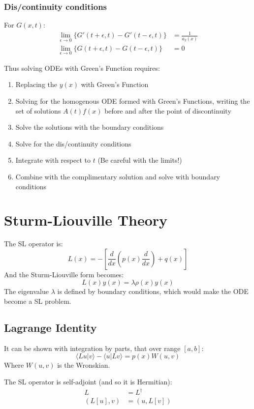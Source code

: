 \documentclass[12pt]{article}
\begin{document}
\subsubsection{Dis/continuity conditions}
For $G(x,t)$:
\begin{align*}
    \lim_{\epsilon\to0}\{G'(t+\epsilon,t)-G'(t-\epsilon,t)\} &= \frac{1}{a_2(x)}\\
    \lim_{\epsilon\to0}\{G(t+\epsilon,t)-G(t-\epsilon,t)\} &= 0
\end{align*}

Thus solving ODEs with Green's Function requires:
\begin{enumerate}
    \item Replacing the $y(x)$ with Green's Function
    \item Solving for the homogenous ODE formed with Green's Functions, writing the set of solutions $A(t)f(x)$ before and after the point of discontinuity
    \item Solve the solutions with the boundary conditions
    \item Solve for the dis/continuity conditions
    \item Integrate with respect to $t$ (Be careful with the limits!)
    \item Combine with the complimentary solution and solve with boundary conditions
\end{enumerate}

\section{Sturm-Liouville Theory}
The SL operator is:
\[L(x) = -\left[\frac{d}{dx}\left(p(x)\frac{d}{dx}\right)+q(x) \right]\]
And the Sturm-Liouville form becomes:
\[ L(x)y(x) = \lambda \rho(x)y(x)\]
The eigenvalue $\lambda$ is defined by boundary conditions, which would make the ODE become a SL problem.

\subsection{Lagrange Identity}
It can be shown with integration by parts, that over range $[a,b]$:
\[ \langle Lu|v\rangle - \langle u|Lv\rangle = p(x)W(u,v)\]
Where $W(u,v)$ is the Wronskian.

The SL operator is self-adjoint (and so it is Hermitian):
\begin{align*}
    L&=L^\dagger\\
    (L[u],v) &= (u,L[v])
\end{align*}
\end{document}
